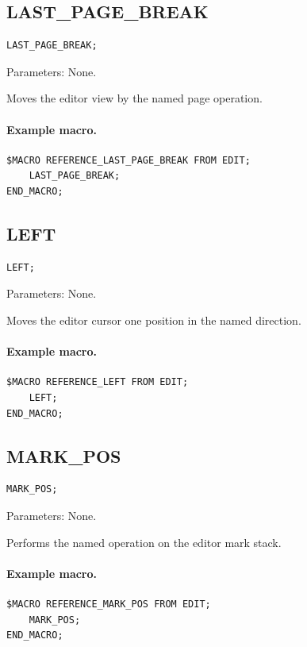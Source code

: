 \documentclass[a4paper,10pt,twoside,openany]{book}
\begin{document}
\label{prim:procedure-last-page-break}
\subsection*{LAST\_PAGE\_BREAK}
\begin{verbatim}
LAST_PAGE_BREAK;
\end{verbatim}
Parameters: None.

Moves the editor view by the named page operation.

\paragraph{Example macro.}
\begin{verbatim}
$MACRO REFERENCE_LAST_PAGE_BREAK FROM EDIT;
    LAST_PAGE_BREAK;
END_MACRO;
\end{verbatim}

\label{prim:procedure-left}
\subsection*{LEFT}
\begin{verbatim}
LEFT;
\end{verbatim}
Parameters: None.

Moves the editor cursor one position in the named direction.

\paragraph{Example macro.}
\begin{verbatim}
$MACRO REFERENCE_LEFT FROM EDIT;
    LEFT;
END_MACRO;
\end{verbatim}

\label{prim:procedure-mark-pos}
\subsection*{MARK\_POS}
\begin{verbatim}
MARK_POS;
\end{verbatim}
Parameters: None.

Performs the named operation on the editor mark stack.

\paragraph{Example macro.}
\begin{verbatim}
$MACRO REFERENCE_MARK_POS FROM EDIT;
    MARK_POS;
END_MACRO;
\end{verbatim}
\end{document}
